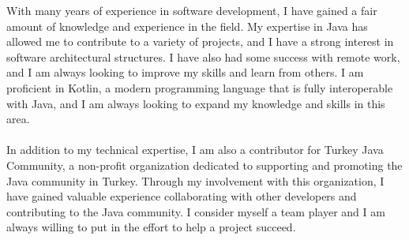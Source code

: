 

\begin{cvparagraph}

    With many years of experience in software development, I have gained a fair amount of knowledge and experience in the field. My expertise in Java has allowed me to contribute to a variety of projects, and I have a strong interest in software architectural structures. I have also had some success with remote work, and I am always looking to improve my skills and learn from others. I am proficient in Kotlin, a modern programming language that is fully interoperable with Java, and I am always looking to expand my knowledge and skills in this area.
    \\
    \\
    In addition to my technical expertise, I am also a contributor for Turkey Java Community, a non-profit organization dedicated to supporting and promoting the Java community in Turkey. Through my involvement with this organization, I have gained valuable experience collaborating with other developers and contributing to the Java community. I consider myself a team player and I am always willing to put in the effort to help a project succeed.
\end{cvparagraph}